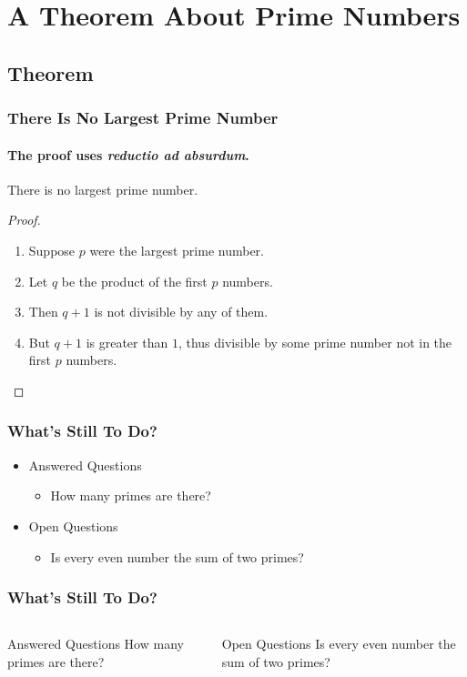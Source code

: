 \documentclass[
	9pt,							%
	mathserif, 				%
	aspectratio=169		%
]{beamer}
\begin{document}
\section[Theorem]{A Theorem About Prime Numbers} 
\subsection*{Theorem}

\begin{frame}
  \frametitle{There Is No Largest Prime Number}
  \framesubtitle{The proof uses \textit{reductio ad absurdum}.}
  \begin{theorem}
    There is no largest prime number.
  \end{theorem}
  \begin{proof}
    \begin{enumerate}
    \item<1-| alert@1> Suppose $p$ were the largest prime number.
    \item<2-> Let $q$ be the product of the first $p$ numbers.
    \item<3-> Then $q+1$ is not divisible by any of them.
    \item<4-> But $q + 1$ is greater than $1$, thus divisible by some prime
      number not in the first $p$ numbers.\qedhere
    \end{enumerate}
  \end{proof}
\end{frame}

\begin{frame}
  \frametitle{What's Still To Do?}
  \begin{itemize}
  \item Answered Questions
    \begin{itemize}
    \item How many primes are there?
    \end{itemize}
  \item Open Questions
    \begin{itemize}
    \item Is every even number the sum of two primes?
    \end{itemize}
  \end{itemize}
\end{frame}

\begin{frame}
  \frametitle{What's Still To Do?}
  \begin{columns}
      \begin{block}{Answered Questions}
        How many primes are there?
      \end{block}
      \begin{block}{Open Questions}
        Is every even number the sum of two primes?
        \cite{Goldbach1742}
      \end{block}
  \end{columns}
\end{frame}
\end{document}
